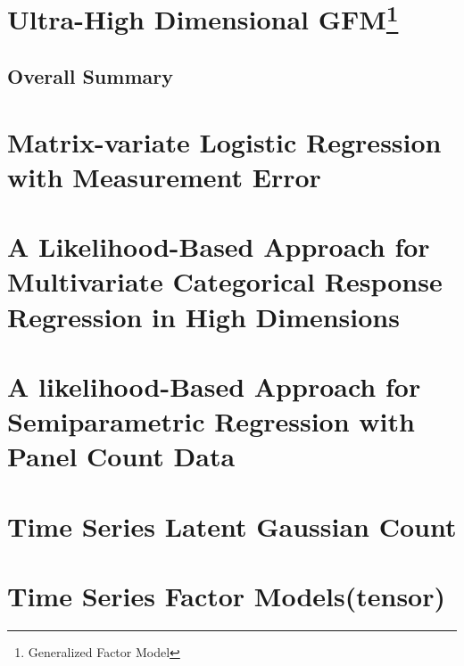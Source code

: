 \documentclass{article}[12pt]
\begin{document}
\section [Ultra-High Dimensional GFM]{Ultra-High Dimensional GFM\footnote{Generalized Factor Model}} 
\subsection{Overall Summary} 

\section{Matrix-variate Logistic Regression with Measurement Error}
\section{A Likelihood-Based Approach for Multivariate Categorical Response Regression in High Dimensions}
\section{A likelihood-Based Approach for Semiparametric Regression with Panel Count Data}


\section{Time Series Latent Gaussian Count}
\section{Time Series Factor Models(tensor)}   
\end{document}
